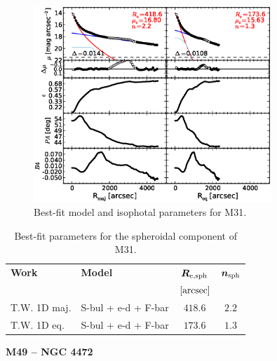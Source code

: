 \documentclass[preprint2]{emulateapj}
\newcommand{\fitfigurewidth}{0.8\textwidth}
\begin{document}
  \begin{figure}[h]
  \begin{center}
  \includegraphics[width=\fitfigurewidth]{images/m31_1Dfit.eps}
  \caption{Best-fit model and isophotal parameters for M31.}
  \end{center}
  \end{figure}


  \begin{table}[h]
  \small
  \caption{Best-fit parameters for the spheroidal component of M31.}
  \begin{center}
  \begin{tabular}{llcc}
  \hline
  {\bf Work} & {\bf Model}   & $\bm R_{\rm e,sph}$    & $\bm n_{\rm sph}$ \\
    &  &  $[\rm arcsec]$ & \\
  \hline
  T.W. 1D maj. & S-bul + e-d + F-bar & $418.6$  &  $2.2$ \\
  T.W. 1D eq.  & S-bul + e-d + F-bar & $173.6$  &  $1.3$ \\
  \hline
  \end{tabular}
  \end{center}
  \label{tab:m31}
  \end{table}

  \clearpage\newpage\noindent
  {\bf M49 -- NGC 4472 \\}
\end{document}

